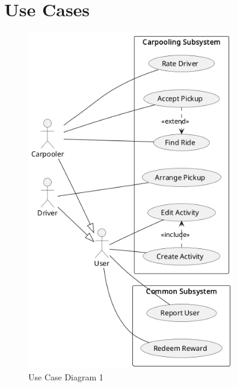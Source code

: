 \documentclass[11pt]{article}
\begin{document}
\newpage

\section{Use Cases}









\begin{figure}
    \centering
    \includegraphics[width=0.8\textwidth]{use-cases-carpooling}
    \caption{Use Case Diagram 1}
\end{figure}
\end{document}

